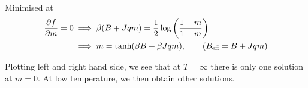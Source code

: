 Minimised at
\begin{align}
  \pdv{f}{m} = 0 &\implies \beta (B + Jqm) = \frac{1}{2} \log \left( \frac{1 + m}{1 - m} \right) \\
  &\implies m = \tanh(\beta B + \beta Jqm), \qquad (B_{\text{eff}} = B + Jqm)
\end{align}

Plotting left and right hand side, we see that at $T=\infty$ there is only one solution at $m=0$. At low temperature, we then obtain other solutions.

